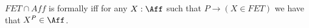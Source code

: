 \begin{lemma}
	$FET \cap Aff$ is formally \etale iff for any $X : \Aff$ such that $P \to (X \in FET)$ we have that $X^P \in \Aff$. 
	
\end{lemma}
